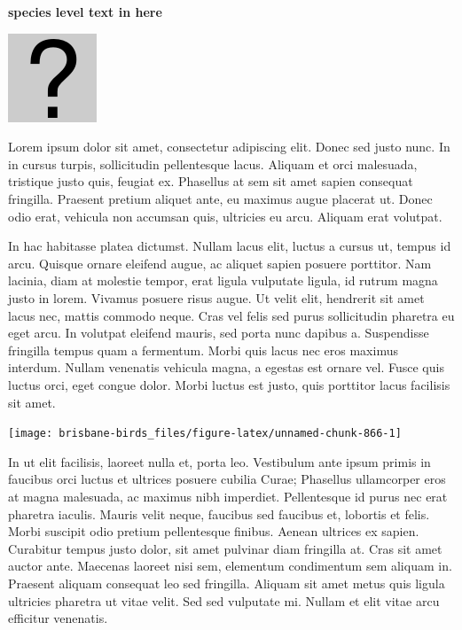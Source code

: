\documentclass[]{book}
\let\origfigure\figure
\let\endorigfigure\endfigure
\renewenvironment{figure}[1][2] {
  \expandafter\origfigure\expandafter[H]
} {
  \endorigfigure
}
\begin{document}
\textbf{species level text in here}

\begin{figure}
\centering
\includegraphics{assets/missing.png}
\caption{No image for species}
\end{figure}

Lorem ipsum dolor sit amet, consectetur adipiscing elit. Donec sed justo
nunc. In in cursus turpis, sollicitudin pellentesque lacus. Aliquam et
orci malesuada, tristique justo quis, feugiat ex. Phasellus at sem sit
amet sapien consequat fringilla. Praesent pretium aliquet ante, eu
maximus augue placerat ut. Donec odio erat, vehicula non accumsan quis,
ultricies eu arcu. Aliquam erat volutpat.

In hac habitasse platea dictumst. Nullam lacus elit, luctus a cursus ut,
tempus id arcu. Quisque ornare eleifend augue, ac aliquet sapien posuere
porttitor. Nam lacinia, diam at molestie tempor, erat ligula vulputate
ligula, id rutrum magna justo in lorem. Vivamus posuere risus augue. Ut
velit elit, hendrerit sit amet lacus nec, mattis commodo neque. Cras vel
felis sed purus sollicitudin pharetra eu eget arcu. In volutpat eleifend
mauris, sed porta nunc dapibus a. Suspendisse fringilla tempus quam a
fermentum. Morbi quis lacus nec eros maximus interdum. Nullam venenatis
vehicula magna, a egestas est ornare vel. Fusce quis luctus orci, eget
congue dolor. Morbi luctus est justo, quis porttitor lacus facilisis sit
amet.

\begin{figure}
\texttt{[image: brisbane-birds\_files/figure-latex/unnamed-chunk-866-1]} \caption{insert figure caption}\label{fig:unnamed-chunk-866}
\end{figure}

In ut elit facilisis, laoreet nulla et, porta leo. Vestibulum ante ipsum
primis in faucibus orci luctus et ultrices posuere cubilia Curae;
Phasellus ullamcorper eros at magna malesuada, ac maximus nibh
imperdiet. Pellentesque id purus nec erat pharetra iaculis. Mauris velit
neque, faucibus sed faucibus et, lobortis et felis. Morbi suscipit odio
pretium pellentesque finibus. Aenean ultrices ex sapien. Curabitur
tempus justo dolor, sit amet pulvinar diam fringilla at. Cras sit amet
auctor ante. Maecenas laoreet nisi sem, elementum condimentum sem
aliquam in. Praesent aliquam consequat leo sed fringilla. Aliquam sit
amet metus quis ligula ultricies pharetra ut vitae velit. Sed sed
vulputate mi. Nullam et elit vitae arcu efficitur venenatis.
\end{document}

